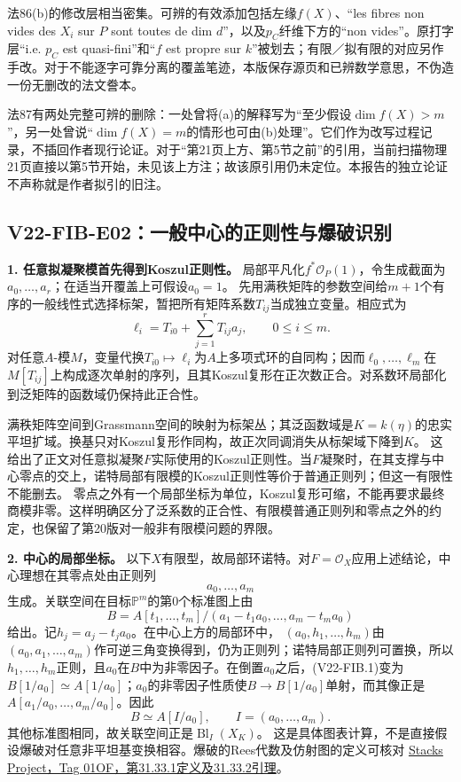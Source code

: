 法86(b)的修改层相当密集。可辨的有效添加包括左缘$f(X)$、“les fibres non vides des $X_i$ sur $P$ sont toutes de dim $d$”，以及$p_C$纤维下方的“non vides”。原打字层“i.e. $p_C$ est quasi-fini”和“$f$ est propre sur $k$”被划去；有限／拟有限的对应另作手改。对于不能逐字可靠分离的覆盖笔迹，本版保存源页和已辨数学意思，不伪造一份无删改的法文誊本。

法87有两处完整可辨的删除：一处曾将(a)的解释写为“至少假设$\dim f(X)>m$”，另一处曾说“$\dim f(X)=m$的情形也可由(b)处理”。它们作为改写过程记录，不插回作者现行论证。对于“第21页上方、第5节之前”的引用，当前扫描物理21页直接以第5节开始，未见该上方注；故该原引用仍未定位。本报告的独立论证不声称就是作者拟引的旧注。

\subsection*{V22-FIB-E02：一般中心的正则性与爆破识别}

\noindent\textbf{1. 任意拟凝聚模首先得到Koszul正则性。}
局部平凡化$f^*\mathcal O_P(1)$，令生成截面为$a_0,\ldots,a_r$；在适当开覆盖上可假设$a_0=1$。
先用满秩矩阵的参数空间给$m+1$个有序的一般线性式选择标架，暂把所有矩阵系数$T_{ij}$当成独立变量。相应式为
\[
\ell_i=T_{i0}+\sum_{j=1}^rT_{ij}a_j,\qquad 0\leq i\leq m.
\]
对任意$A$-模$M$，变量代换$T_{i0}\mapsto\ell_i$为$A$上多项式环的自同构；因而$\ell_0,\ldots,\ell_m$在$M[T_{ij}]$上构成逐次单射的序列，且其Koszul复形在正次数正合。对系数环局部化到泛矩阵的函数域仍保持此正合性。

满秩矩阵空间到Grassmann空间的映射为标架丛；其泛函数域是$K=k(\eta)$的忠实平坦扩域。换基只对Koszul复形作同构，故正次同调消失从标架域下降到$K$。
这给出了正文对任意拟凝聚$F$实际使用的Koszul正则性。当$F$凝聚时，在其支撑与中心零点的交上，诺特局部有限模的Koszul正则性等价于普通正则列；但这一有限性不能删去。
零点之外有一个局部坐标为单位，Koszul复形可缩，不能再要求最终商模非零。这样明确区分了泛系数的正合性、有限模普通正则列和零点之外的约定，也保留了第20版对一般非有限模问题的界限。

\noindent\textbf{2. 中心的局部坐标。}
以下$X$有限型，故局部环诺特。对$F=\mathcal O_X$应用上述结论，中心理想在其零点处由正则列
\[
a_0,\ldots,a_m
\]
生成。关联空间在目标$\mathbb P^m$的第0个标准图上由
\[
B=A[t_1,\ldots,t_m]/(a_1-t_1a_0,\ldots,a_m-t_ma_0)
\tag{V22-FIB.1}
\]
给出。记$h_j=a_j-t_ja_0$。在中心上方的局部环中，
$(a_0,h_1,\ldots,h_m)$由$(a_0,a_1,\ldots,a_m)$作可逆三角变换得到，仍为正则列；诺特局部正则列可置换，所以$h_1,\ldots,h_m$正则，且$a_0$在$B$中为非零因子。在倒置$a_0$之后，(V22-FIB.1)变为$B[1/a_0]\simeq A[1/a_0]$；$a_0$的非零因子性质使$B\to B[1/a_0]$单射，而其像正是$A[a_1/a_0,\ldots,a_m/a_0]$。因此
\[
B\simeq A[I/a_0],\qquad I=(a_0,\ldots,a_m).
\]
其他标准图相同，故关联空间正是$\operatorname{Bl}_I(X_K)$。
这是具体图表计算，不是直接假设爆破对任意非平坦基变换相容。爆破的Rees代数及仿射图的定义可核对
\href{https://stacks.math.columbia.edu/tag/01OF}{Stacks Project，Tag 01OF，第31.33.1定义及31.33.2引理}。

